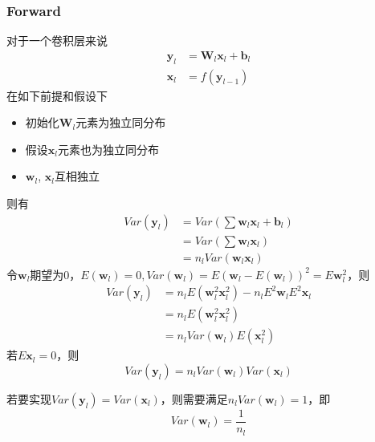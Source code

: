 \subsubsection{Forward}
对于一个卷积层来说
\begin{equation}
    \begin{split}
        \mathbf{y}_l &= \mathbf{W}_l \mathbf{x}_l + \mathbf{b}_l\\
        \mathbf{x}_l &= f(\mathbf{y}_{l-1})
    \end{split}
\end{equation}
在如下前提和假设下
\begin{itemize}
    \item 初始化$\mathbf{W}_l$元素为独立同分布
    \item 假设$\mathbf{x}_l$元素也为独立同分布
    \item $\mathbf{w}_l$, $\mathbf{x}_l$互相独立
\end{itemize}
则有
\begin{equation}
    \begin{split}
        Var(\mathbf{y}_l) &= Var(\sum \mathbf{w}_l \mathbf{x}_l + \mathbf{b}_l)\\
        &= Var(\sum \mathbf{w}_l \mathbf{x}_l) \\
        &= n_l Var(\mathbf{w}_l \mathbf{x}_l)
    \end{split}
\end{equation}
令$\mathbf{w}_l$期望为0，$E(\mathbf{w}_l) = 0, Var(\mathbf{w}_l) = E(\mathbf{w}_l - E(\mathbf{w}_l))^2 = E\mathbf{w}_l^2$，则
\begin{equation}
    \begin{split}
        Var(\mathbf{y}_l) &= n_l E(\mathbf{w}_l^2\mathbf{x}_l^2) - n_l E^2\mathbf{w}_l E^2 \mathbf{x}_l \\
        &= n_l E(\mathbf{w}_l^2\mathbf{x}_l^2) \\
        &= n_l Var(\mathbf{w}_l)E(\mathbf{x}_l^2)
    \end{split}
\end{equation}
若$E\mathbf{x}_l = 0$，则
\begin{equation}
    Var(\mathbf{y}_l) = n_l Var(\mathbf{w}_l)Var(\mathbf{x}_l)
\end{equation}

若要实现$Var(\mathbf{y}_l) = Var(\mathbf{x}_l)$，则需要满足$n_l Var(\mathbf{w}_l) = 1$，即
\begin{equation}
    Var(\mathbf{w}_l) = \frac{1}{n_l}
\end{equation}

